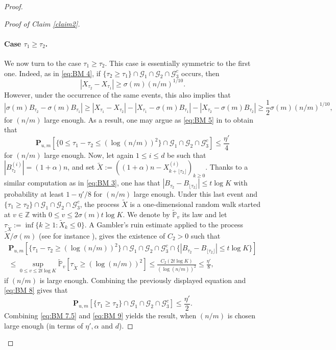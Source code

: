 \documentclass[11pt,a4paper]{article}
\numberwithin{equation}{section}
\theoremstyle{plain}
\theoremstyle{definition}
\begin{document}
\begin{proof}
\begin{proof}[Proof of Claim \textup{\ref{claim2}}]
 \paragraph{Case $\tau_1\geq \tau_2$.} We now turn to the case $\tau_1\geq\tau_2$. This case is essentially symmetric to the first one. Indeed, as in \eqref{eq:BM 4}, if $\{\tau_2\geq \tau_1\}\cap \mathcal G_1\cap \mathcal G_2\cap \mathcal G_3^c$ occurs, then
 \begin{equation}
 	|X_{\tau_2}-X_{\tau_1}|\geq \sigma(m)(n/m)^{1/10}.
 \end{equation}
 However, under the occurrence of the same events, this also implies that
 \begin{equation}
 	|\sigma(m)B_{\tau_2}-\sigma(m)B_{\tau_1}|\geq |X_{\tau_1}-X_{\tau_2}|-|X_{\tau_1}-\sigma(m)B_{\tau_1}|-|X_{\tau_2}-\sigma(m)B_{\tau_2}|\geq \frac{1}{2}\sigma(m)(n/m)^{1/10},
 \end{equation}
 for $(n/m)$ large enough. As a result, one may argue as \eqref{eq:BM 5} in to obtain that
 \begin{equation}\label{eq:BM 8}
 	\mathbf P_{u,m}[\{0\leq \tau_1-\tau_2\leq (\log (n/m))^2\}\cap \mathcal G_1\cap \mathcal G_2\cap \mathcal G_3^c]\leq \frac{\eta'}{4}
 \end{equation}
 for $(n/m)$ large enough. Now, let again $1\leq i \leq d$ be such that $|B_{\tau_2}^{(i)}|=(1+\alpha)n$, and set $\tilde X:= ((1+\alpha)n-X^{(i)}_{k+\lfloor \tau_2\rfloor})_{k\geq 0}$. Thanks to a similar computation as in \eqref{eq:BM 3}, one has that $|B_{\tau_2}-B_{\lfloor \tau_2\rfloor}|\leq t\log K$ with probability at least $1-\eta'/8$ for $(n/m)$ large enough. Under this last event and $\{\tau_1\geq \tau_2\}\cap \mathcal G_1\cap \mathcal G_2\cap \mathcal G_3^c$, the process $\tilde X$ is a one-dimensional random walk started at $v\in \mathbb Z$ with $0\leq v \leq 2\sigma(m)t\log K$. We denote by $\tilde{\mathbb P}_v$ its law and let $\tau_{\tilde X}:=\inf\{k\geq 1: \tilde X_k\leq 0\}$. A Gambler's ruin estimate applied to the process $\tilde X/\sigma(m)$ (see for instance \cite[Theorem~5.1.7]{LawlerLimicRandomWalks2010}), gives the existence of $C_2>0$ such that
 \begin{multline}
 	\mathbf P_{u,m}[\{\tau_1-\tau_2\geq (\log (n/m))^2\}\cap \mathcal G_1\cap \mathcal G_2\cap \mathcal G_3^c\cap \{|B_{\tau_2}-B_{\lfloor \tau _2\rfloor}|\leq t\log K\}]\\\leq \sup_{0\leq v\leq 2t\log K}\tilde{\mathbb P}_v[\tau_{\tilde X} \geq (\log (n/m))^2]\leq \frac{C_2(2t\log K)}{(\log(n/m))^2}\leq \frac{\eta'}{8},
 \end{multline}
 if $(n/m)$ is large enough. Combining the previously displayed equation and \eqref{eq:BM 8} gives that
 \begin{equation}\label{eq:BM 9}
 	\mathbf P_{u,m}[\{\tau_1\geq \tau_2\}\cap \mathcal G_1\cap \mathcal G_2\cap\mathcal G_3^c]\leq \frac{\eta'}{2}.
 \end{equation}
 Combining \eqref{eq:BM 7.5} and \eqref{eq:BM 9} yields the result, when $(n/m)$ is chosen large enough (in terms of $\eta',\alpha$ and $d$).
\end{proof}


\end{proof}
\end{document}

